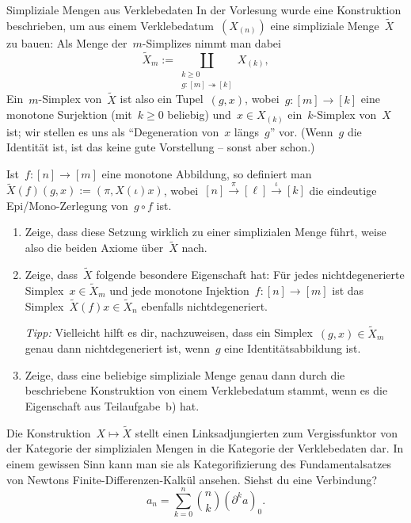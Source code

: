 \documentclass{uebblatt}
\begin{document}
\begin{aufgabe}{Simpliziale Mengen aus Verklebedaten}
In der Vorlesung wurde eine Konstruktion beschrieben, um aus einem
Verklebedatum~$(X_{(n)})$ eine simpliziale Menge~$\widetilde X$ zu bauen: Als
Menge der~$m$-Simplizes nimmt man dabei
\[ \widetilde X_m := \coprod_{\substack{k \geq 0 \\ g : [m] \twoheadrightarrow [k]}} X_{(k)}, \]
Ein~$m$-Simplex von~$\widetilde X$ ist also ein Tupel~$(g,x)$, wobei~$g : [m]
\to [k]$ eine monotone Surjektion (mit~$k \geq 0$ beliebig) und~$x \in X_{(k)}$
ein~$k$-Simplex von~$X$ ist; wir stellen es uns als "`Degeneration von~$x$
längs~$g$"' vor. (Wenn~$g$ die Identität ist, ist das keine gute Vorstellung --
sonst aber schon.)

Ist~$f : [n] \to [m]$ eine monotone Abbildung, so definiert
man~$\widetilde X(f)(g,x) := (\pi, X(\iota)x)$, wobei~$[n]
\xrightarrow{\pi} [\ell] \xrightarrow{\iota} [k]$ die eindeutige Epi/Mono-Zerlegung
von~$g \circ f$ ist.
\begin{enumerate}
\item Zeige, dass diese Setzung wirklich zu einer simplizialen Menge führt,
weise also die beiden Axiome über~$\widetilde X$ nach.
\item Zeige, dass~$\widetilde X$ folgende besondere Eigenschaft hat: Für jedes
nichtdegenerierte Simplex~$x \in \widetilde X_m$ und jede monotone Injektion~$f
: [n] \to [m]$ ist das Simplex~$\widetilde X(f)x \in \widetilde X_n$
ebenfalls nichtdegeneriert.

\emph{Tipp:} Vielleicht hilft es dir, nachzuweisen, dass ein Simplex~$(g,x) \in
\widetilde X_m$ genau dann nichtdegeneriert ist, wenn~$g$ eine
Identitätsabbildung ist.

\item Zeige, dass eine beliebige simpliziale Menge genau dann durch die
beschriebene Konstruktion von einem Verklebedatum stammt, wenn es die
Eigenschaft aus Teilaufgabe~b) hat.
\end{enumerate}

Die Konstruktion~$X \mapsto \widetilde X$ stellt einen Linksadjungierten zum
Vergissfunktor von der Kategorie der simplizialen Mengen in die Kategorie der
Verklebedaten dar. In einem gewissen Sinn kann man sie als Kategorifizierung
des Fundamentalsatzes von Newtons Finite-Differenzen-Kalkül ansehen.
Siehst du eine Verbindung?
\[ a_n = \sum_{k=0}^n \binom{n}{k} (\partial^k a)_0. \]
\end{aufgabe}
\end{document}
